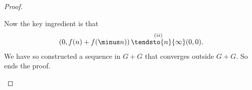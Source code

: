 \begin{proof}
\begin{enumerate}
%
Now the key ingredient is that %
%
\begin{align}
  \left(0, f(n)+f(\minus n)\right) \overset{(ii)}{\tendsto{n}{\infty}} (0, 0). 
\end{align}
%
We have so constructed a sequence in $G+G$ that converges outside $G+G$. %
So ends the proof.
\end{enumerate}
\end{proof}
